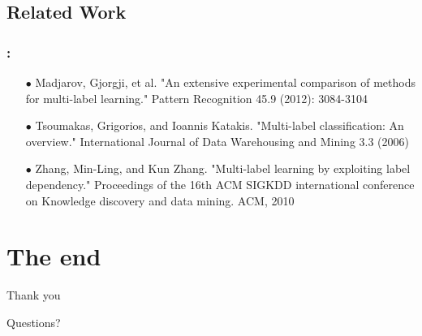 \documentclass{beamer}
\begin{document}
\subsection{Related Work}
\begin{frame}
\frametitle{\insertsection : \insertsubsection}
\begin{itemize}
\item[$\bullet$] Madjarov, Gjorgji, et al. "An extensive experimental comparison of methods for multi-label learning." Pattern Recognition 45.9 (2012): 3084-3104
\item[$\bullet$] Tsoumakas, Grigorios, and Ioannis Katakis. "Multi-label classification: An overview." International Journal of Data Warehousing and Mining 3.3 (2006)
\item[$\bullet$] Zhang, Min-Ling, and Kun Zhang. "Multi-label learning by exploiting label dependency." Proceedings of the 16th ACM SIGKDD international conference on Knowledge discovery and data mining. ACM, 2010
\end{itemize}
\end{frame}

\section{The end}
\begin{frame}
\Huge{\centerline{Thank you}}
\Huge{\centerline{Questions?}}
\end{frame}
\end{document}
